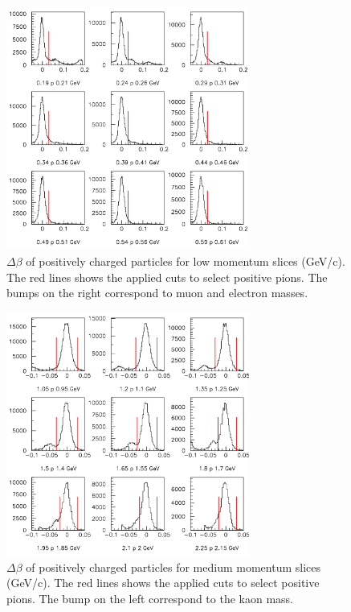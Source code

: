 \begin{figure}[tbp]
\centering
\includegraphics[width=8cm] {answer-fig/TofProfile1.png} 
\caption {$\Delta \beta$ of positively charged particles for low momentum slices 
(GeV/c). The red lines shows the applied cuts to select positive pions. The bumps on the right
correspond to muon and electron masses.}
\label{TOF-1}
\end{figure}

\begin{figure}[tbp]
\centering
\includegraphics[width=8cm] {answer-fig/TofProfile2.png} 
\caption {$\Delta \beta$ of positively charged particles for medium momentum slices 
(GeV/c). The red lines shows the applied cuts to select positive pions. The bump on the left
correspond to the kaon mass.}
\label{TOF-2}
\end{figure}

